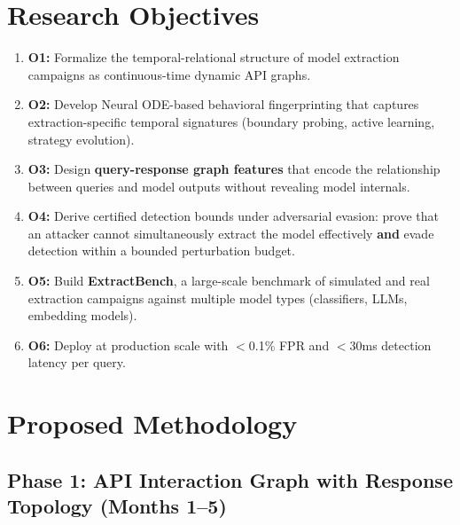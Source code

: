 \documentclass[12pt,a4paper]{article}
\begin{document}
\section{Research Objectives}

\begin{enumerate}
    \item \textbf{O1:} Formalize the temporal-relational structure of model extraction campaigns as continuous-time dynamic API graphs.
    
    \item \textbf{O2:} Develop Neural ODE-based behavioral fingerprinting that captures extraction-specific temporal signatures (boundary probing, active learning, strategy evolution).
    
    \item \textbf{O3:} Design \textbf{query-response graph features} that encode the relationship between queries and model outputs without revealing model internals.
    
    \item \textbf{O4:} Derive certified detection bounds under adversarial evasion: prove that an attacker cannot simultaneously extract the model effectively \textbf{and} evade detection within a bounded perturbation budget.
    
    \item \textbf{O5:} Build \textbf{ExtractBench}, a large-scale benchmark of simulated and real extraction campaigns against multiple model types (classifiers, LLMs, embedding models).
    
    \item \textbf{O6:} Deploy at production scale with $<$0.1\% FPR and $<$30ms detection latency per query.
\end{enumerate}

\section{Proposed Methodology}

\subsection{Phase 1: API Interaction Graph with Response Topology (Months 1--5)}
\end{document}
